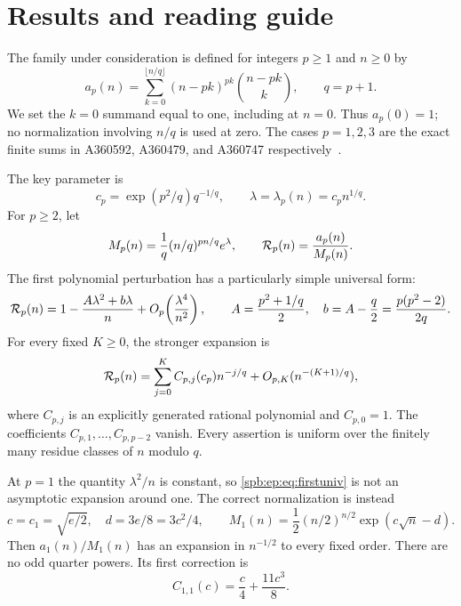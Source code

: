 \section{Results and reading guide}
\label{spb:ep:sec:overview}
The family under consideration is defined for integers $p\ge1$ and $n\ge0$ by
\begin{equation}\label{spb:ep:eq:counts}
 a_p(n)=\sum_{k=0}^{\lfloor n/q\rfloor}(n-pk)^{pk}\binom{n-pk}{k},
 \qquad q=p+1.
\end{equation}
We set the $k=0$ summand equal to one, including at $n=0$.
Thus $a_p(0)=1$; no normalization involving $n/q$ is used at zero.
The cases $p=1,2,3$ are the exact finite sums in A360592, A360479, and
A360747 respectively~\cite{oeis1,oeis2,oeis3}.

The key parameter is
\begin{equation}\label{spb:ep:eq:lambda}
 c_p=\exp(p^2/q)q^{-1/q},\qquad
 \lambda=\lambda_p(n)=c_p n^{1/q}.
\end{equation}
For $p\ge2$, let
\begin{equation}\label{spb:ep:eq:normalization}
 M_p(n)=\frac1q(n/q)^{pn/q}e^\lambda,
 \qquad \mathcal R_p(n)=\frac{a_p(n)}{M_p(n)}.
\end{equation}
The first polynomial perturbation has a particularly simple universal form:
\begin{equation}\label{spb:ep:eq:firstuniv}
 \mathcal R_p(n)=1-\frac{A\lambda^2+b\lambda}{n}
       +O_p\!\left(\frac{\lambda^4}{n^2}\right),\qquad
 A=\frac{p^2+1/q}{2},\quad b=A-\frac q2=\frac{p(p^2-2)}{2q}.
\end{equation}
For every fixed $K\ge0$, the stronger expansion is
\begin{equation}\label{spb:ep:eq:overviewfixed}
 \mathcal R_p(n)=\sum_{j=0}^K C_{p,j}(c_p)n^{-j/q}
                  +O_{p,K}(n^{-(K+1)/q}),
\end{equation}
where $C_{p,j}$ is an explicitly generated rational polynomial and
$C_{p,0}=1$. The coefficients $C_{p,1},\ldots,C_{p,p-2}$ vanish.
Every assertion is uniform over the finitely many residue classes of $n$ modulo $q$.

At $p=1$ the quantity $\lambda^2/n$ is constant, so
\eqref{spb:ep:eq:firstuniv} is not an asymptotic expansion around one. The correct
normalization is instead
\begin{equation}\label{spb:ep:eq:criticalM}
 c=c_1=\sqrt{e/2},\quad d=3e/8=3c^2/4,\qquad
 M_1(n)=\frac12(n/2)^{n/2}\exp(c\sqrt n-d).
\end{equation}
Then $a_1(n)/M_1(n)$ has an expansion in $n^{-1/2}$ to every fixed
order. There are no odd quarter powers. Its first correction is
\begin{equation}\label{spb:ep:eq:criticalfirst}
 C_{1,1}(c)=\frac c4+\frac{11c^3}{8}.
\end{equation}


